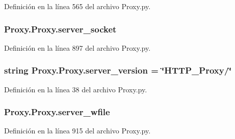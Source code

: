 Definición en la línea 565 del archivo Proxy.\-py.

\hypertarget{class_proxy_1_1_proxy_aa0ad641288078cfa3c7ca4370e74859c}{
\subsubsection[{server\-\_\-socket}]{\setlength{\rightskip}{0pt plus 5cm}Proxy.\-Proxy.\-server\-\_\-socket}}\label{class_proxy_1_1_proxy_aa0ad641288078cfa3c7ca4370e74859c}


Definición en la línea 897 del archivo Proxy.\-py.

\hypertarget{class_proxy_1_1_proxy_a5b2e47ca8b9c1f1f1bb66947420ae45f}{
\subsubsection[{server\-\_\-version}]{\setlength{\rightskip}{0pt plus 5cm}string Proxy.\-Proxy.\-server\-\_\-version = \char`\"{}H\-T\-T\-P\-\_\-\-Proxy/\char`\"{}\hspace{0.3cm}{\ttfamily [static]}}}\label{class_proxy_1_1_proxy_a5b2e47ca8b9c1f1f1bb66947420ae45f}


Definición en la línea 38 del archivo Proxy.\-py.

\hypertarget{class_proxy_1_1_proxy_abaa6decc509fa9749a7070681840e60f}{
\subsubsection[{server\-\_\-wfile}]{\setlength{\rightskip}{0pt plus 5cm}Proxy.\-Proxy.\-server\-\_\-wfile}}\label{class_proxy_1_1_proxy_abaa6decc509fa9749a7070681840e60f}


Definición en la línea 915 del archivo Proxy.\-py.

